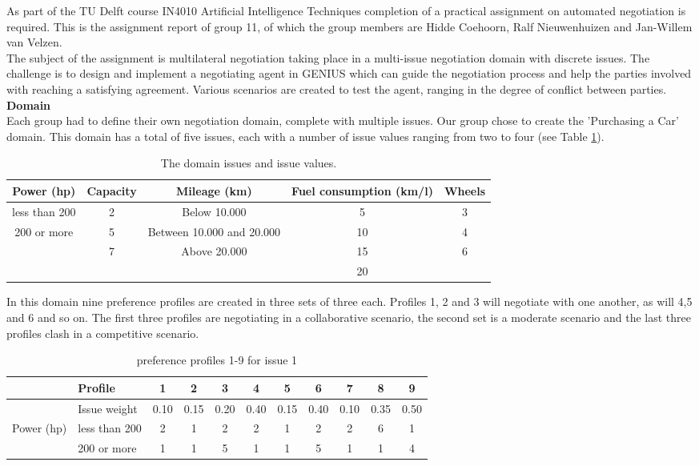 \documentclass[11pt,a4paper]{report}
\begin{document}
As part of the TU Delft course IN4010 Artificial Intelligence Techniques completion of a practical assignment on automated negotiation is required. This is the assignment report of group 11, of which the group members are Hidde Coehoorn, Ralf Nieuwenhuizen and Jan-Willem van Velzen.\\

The subject of the assignment is multilateral negotiation taking place in a multi-issue negotiation domain with discrete issues. The challenge is to design and implement a negotiating agent in GENIUS which can guide the negotiation process and help the parties involved with reaching a satisfying agreement. Various scenarios are created to test the agent, ranging in the degree of conflict between parties.\\

\textbf{Domain}\\
Each group had to define their own negotiation domain, complete with multiple issues. Our group chose to create the 'Purchasing a Car' domain. This domain has a total of five issues, each with a number of issue values ranging from two to four (see Table \ref{tab:domainissues}).

\begin{table}[H]
\centering
\caption{The domain issues and issue values.}
\label{tab:domainissues}
\begin{tabular}{|c|c|c|c|c|}
\hline
Power (hp) & Capacity & Mileage (km) & Fuel consumption (km/l) & Wheels \\
\hline
less than 200 & 2 & Below 10.000 & 5 & 3 \\
200 or more & 5 & Between 10.000 and 20.000 & 10 & 4 \\
& 7 & Above 20.000 & 15 & 6 \\
& & & 20 & \\ 
\hline
\end{tabular}
\end{table}


In this domain nine preference profiles are created in three sets of three each. Profiles 1, 2 and 3 will negotiate with one another, as will 4,5 and 6 and so on. The first three profiles are negotiating in a collaborative scenario, the second set is a moderate scenario and the last three profiles clash in a competitive scenario. 

\newpage



\begin{table}[H]
\centering
\caption{preference profiles 1-9 for issue 1}
\label{tab:issue1}
\begin{tabular}{|p{3cm}|p{3cm}||c|c|c|c|c|c|c|c|c|}
\hline
&Profile & 1 & 2 & 3 & 4 & 5 & 6 & 7 & 8 & 9 \\
\hline
&Issue weight& 0.10 & 0.15 & 0.20 & 0.40 & 0.15 & 0.40 & 0.10 & 0.35 & 0.50 \\
\hline
\hline
Power (hp)&less than 200 & 2 & 1 &2 &2 &1 &2 &2 &6 &1 \\
&200 or more   & 1 & 1 &5 &1 &1 &5 &1 &1 &4 \\
\hline
\end{tabular}
\end{table}
\end{document}
